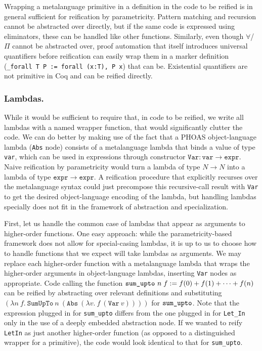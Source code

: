 Wrapping a metalanguage primitive in a definition in the code to be reified is in general sufficient for reification by parametricity.
Pattern matching and recursion cannot be abstracted over directly, but if the same code is expressed using eliminators, these can be handled like other functions.
Similarly, even though $\forall$/$\Pi$ cannot be abstracted over, proof automation that itself introduces universal quantifiers before reification can easily wrap them in a marker definition (\texttt{\_forall T P := forall (x:T), P x}) that can be.
Existential quantifiers are not primitive in Coq and can be reified directly.

\subsubsection{Lambdas.}\label{sec:walkthrough-lambdas}

While it would be sufficient to require that, in code to be reified, we write all lambdas with a named wrapper function, that would significantly clutter the code.
We can do better by making use of the fact that a PHOAS object-language lambda (\texttt{Abs} node) consists of a metalanguage lambda that binds a value of type \texttt{var}, which can be used in expressions through constructor $\mathtt{Var} : \mathtt{var} \to \mathtt{expr}$.
Naive reification by parametricity would turn a lambda of type $N \to N$ into a lambda of type $\mathtt{expr} \to \mathtt{expr}$.
A reification procedure that explicitly recurses over the metalanguage syntax could just precompose this recursive-call result with \texttt{Var} to get the desired object-language encoding of the lambda, but handling lambdas specially does not fit in the framework of abstraction and specialization.

First, let us handle the common case of lambdas that appear as arguments to higher-order functions.
One easy approach: while the parametricity-based framework does not allow for special-casing lambdas, it is up to us to choose how to handle functions that we expect will take lambdas as arguments.
We may replace each higher-order function with a metalanguage lambda that wraps the higher-order arguments in object-language lambdas, inserting \texttt{Var} nodes as appropriate.
Code calling the function $\text{\texttt{sum\_upto} }n\; f := f(0) + f(1) + \cdots + f(n)$ can be reified by abstracting over relevant definitions and substituting
$(\lambda n\ f.\ \texttt{SumUpTo}\ n\ (\texttt{Abs}\ (\lambda v.\ f\ (\texttt{Var}\ v))))$ for $\text{\texttt{sum\_upto}}$.
Note that the expression plugged in for \texttt{sum\_upto} differs from the one plugged in for \texttt{Let\_In} only in the use of a deeply embedded abstraction node.
If we wanted to reify \texttt{LetIn} as just another higher-order function (as opposed to a distinguished wrapper for a primitive), the code would look identical to that for \texttt{sum\_upto}.

